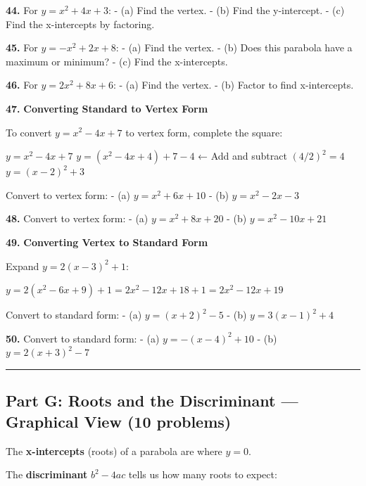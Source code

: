\documentclass[
  11pt,
]{article}
\begin{document}
\textbf{44.} For \(y = x^2 + 4x + 3\): - (a) Find the vertex. - (b) Find
the y-intercept. - (c) Find the x-intercepts by factoring.

\textbf{45.} For \(y = -x^2 + 2x + 8\): - (a) Find the vertex. - (b)
Does this parabola have a maximum or minimum? - (c) Find the
x-intercepts.

\textbf{46.} For \(y = 2x^2 + 8x + 6\): - (a) Find the vertex. - (b)
Factor to find x-intercepts.

\textbf{47.} \textbf{Converting Standard to Vertex Form}

To convert \(y = x^2 - 4x + 7\) to vertex form, complete the square:

\(y = x^2 - 4x + 7\) \(y = (x^2 - 4x + 4) + 7 - 4\) ← Add and subtract
\((4/2)^2 = 4\) \(y = (x - 2)^2 + 3\)

Convert to vertex form: - (a) \(y = x^2 + 6x + 10\) - (b)
\(y = x^2 - 2x - 3\)

\textbf{48.} Convert to vertex form: - (a) \(y = x^2 + 8x + 20\) - (b)
\(y = x^2 - 10x + 21\)

\textbf{49.} \textbf{Converting Vertex to Standard Form}

Expand \(y = 2(x - 3)^2 + 1\):

\(y = 2(x^2 - 6x + 9) + 1 = 2x^2 - 12x + 18 + 1 = 2x^2 - 12x + 19\)

Convert to standard form: - (a) \(y = (x + 2)^2 - 5\) - (b)
\(y = 3(x - 1)^2 + 4\)

\textbf{50.} Convert to standard form: - (a) \(y = -(x - 4)^2 + 10\) -
(b) \(y = 2(x + 3)^2 - 7\)

\begin{center}\rule{0.5\linewidth}{0.5pt}\end{center}

\hypertarget{part-g-roots-and-the-discriminant-graphical-view-10-problems}{%
\subsection{Part G: Roots and the Discriminant --- Graphical View (10
problems)}\label{part-g-roots-and-the-discriminant-graphical-view-10-problems}}

The \textbf{x-intercepts} (roots) of a parabola are where \(y = 0\).

The \textbf{discriminant} \(b^2 - 4ac\) tells us how many roots to
expect:
\end{document}

